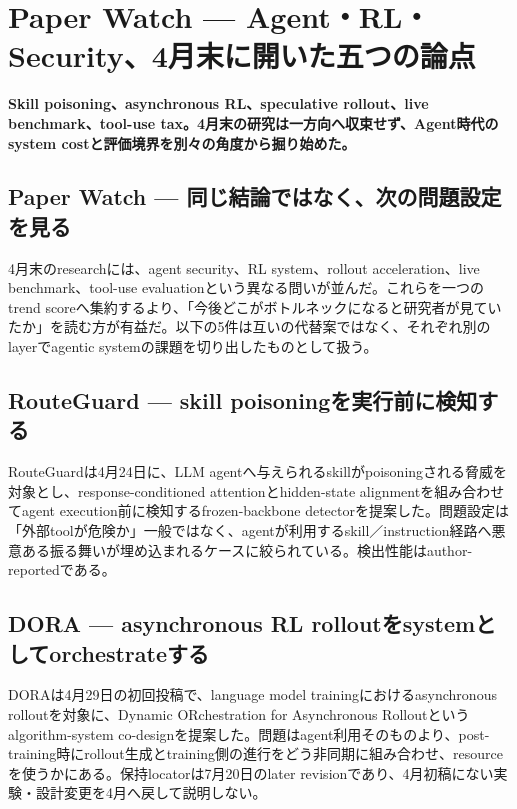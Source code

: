 \section{Paper Watch — Agent・RL・Security、4月末に開いた五つの論点}
\label{pkg:paper-watch-april}
\noindent\textbf{Skill poisoning、asynchronous RL、speculative rollout、live benchmark、tool-use tax。4月末の研究は一方向へ収束せず、Agent時代のsystem costと評価境界を別々の角度から掘り始めた。}\autocite{src-0d99a9f2485e,src-56e226358d6f,src-6bd60c76cba7,src-841d4b563b9d,src-8e578daed9ed}

\subsection{Paper Watch — 同じ結論ではなく、次の問題設定を見る}

4月末のresearchには、agent security、RL system、rollout acceleration、live benchmark、tool-use evaluationという異なる問いが並んだ。これらを一つのtrend scoreへ集約するより、「今後どこがボトルネックになると研究者が見ていたか」を読む方が有益だ。以下の5件は互いの代替案ではなく、それぞれ別のlayerでagentic systemの課題を切り出したものとして扱う。\autocite{src-0d99a9f2485e,src-56e226358d6f,src-6bd60c76cba7,src-841d4b563b9d,src-8e578daed9ed}


\subsection{RouteGuard — skill poisoningを実行前に検知する}

RouteGuardは4月24日に、LLM agentへ与えられるskillがpoisoningされる脅威を対象とし、response-conditioned attentionとhidden-state alignmentを組み合わせてagent execution前に検知するfrozen-backbone detectorを提案した。問題設定は「外部toolが危険か」一般ではなく、agentが利用するskill／instruction経路へ悪意ある振る舞いが埋め込まれるケースに絞られている。検出性能はauthor-reportedである。\autocite{src-0d99a9f2485e}


\subsection{DORA — asynchronous RL rolloutをsystemとしてorchestrateする}

DORAは4月29日の初回投稿で、language model trainingにおけるasynchronous rolloutを対象に、Dynamic ORchestration for Asynchronous Rolloutというalgorithm-system co-designを提案した。問題はagent利用そのものより、post-training時にrollout生成とtraining側の進行をどう非同期に組み合わせ、resourceを使うかにある。保持locatorは7月20日のlater revisionであり、4月初稿にない実験・設計変更を4月へ戻して説明しない。\autocite{src-6bd60c76cba7}


